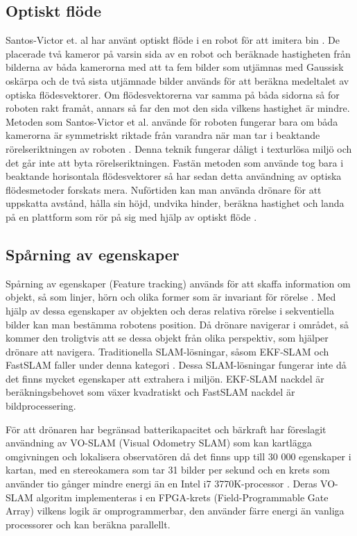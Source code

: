 \subsection{Optiskt flöde}

Santos-Victor et. al har använt optiskt flöde i en robot för att imitera bin \citep{341094}. De placerade två kameror på varsin sida av en robot och beräknade hastigheten från bilderna av båda kamerorna med att ta fem bilder som utjämnas med Gaussisk oskärpa och de två sista utjämnade bilder används för att beräkna medeltalet av optiska flödesvektorer. Om flödesvektorerna var samma på båda sidorna så for roboten rakt framåt, annars så far den mot den sida vilkens hastighet är mindre. Metoden som Santos-Victor et al. använde för roboten fungerar bara om båda kamerorna är symmetriskt riktade från varandra när man tar i beaktande rörelseriktningen av roboten \citep{982903}. Denna teknik fungerar dåligt i texturlösa miljö och det går inte att byta rörelseriktningen. Fastän metoden som \cite{341094} använde tog bara i beaktande horisontala flödesvektorer så har sedan detta användning av optiska flödesmetoder forskats mera. Nuförtiden kan man använda drönare för att uppskatta avstånd, hålla sin höjd, undvika hinder, beräkna hastighet och landa på en plattform som rör på sig med hjälp av optiskt flöde \citep{6564752}.

\subsection{Spårning av egenskaper}

Spårning av egenskaper (Feature tracking) används för att skaffa information om objekt, så som linjer, hörn och olika former som är invariant för rörelse \citep{geospatial}. Med hjälp av dessa egenskaper av objekten och deras relativa rörelse i sekventiella bilder kan man bestämma robotens position. Då drönare navigerar i området, så kommer den troligtvis att se dessa objekt från olika perspektiv, som hjälper drönare att navigera. Traditionella SLAM-lösningar, såsom EKF-SLAM och FastSLAM faller under denna kategori \citep{voslamlatif}. Dessa SLAM-lösningar fungerar inte då det finns mycket egenskaper att extrahera i miljön. EKF-SLAM nackdel är beräkningsbehovet som växer kvadratiskt och FastSLAM nackdel är bildprocessering. 

För att drönaren har begränsad batterikapacitet och bärkraft har \cite{voslam} föreslagit användning av VO-SLAM (Visual Odometry SLAM) som kan kartlägga omgivningen och lokalisera observatören då det finns upp till 30 000 egenskaper i kartan, med en stereokamera som tar 31 bilder per sekund och en krets som använder tio gånger mindre energi än en Intel i7 3770K-processor \citep{voslam}. Deras VO-SLAM algoritm implementeras i en FPGA-krets (Field-Programmable Gate Array) vilkens logik är omprogrammerbar, den använder färre energi än vanliga processorer och kan beräkna parallellt. 


